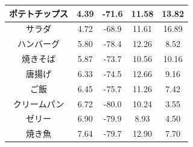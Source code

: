 \begin{table}[t]
{\begin{tabular}{c|c|c|c|c}
            ポテトチップス     & 4.39         & -71.6                                                                                              & 11.58                                                        & 13.82                                                        \\ \hline
            サラダ         & 4.72         & -68.9                                                                                              & 11.61                                                        & 16.89                                                        \\ \hline
            ハンバーグ       & 5.80         & -78.4                                                                                              & 12.26                                                        & 8.52                                                         \\ \hline
            焼きそば        & 5.87         & -73.7                                                                                              & 10.56                                                        & 10.16                                                        \\ \hline
            唐揚げ         & 6.33         & -74.5                                                                                              & 12.66                                                        & 9.16                                                         \\ \hline
            ご飯          & 6.45         & -75.7                                                                                              & 11.26                                                        & 7.42                                                         \\ \hline
            クリームパン      & 6.72         & -80.0                                                                                              & 10.24                                                        & 3.55                                                         \\ \hline
            ゼリー         & 6.90         & -79.9                                                                                              & 8.93                                                         & 4.50                                                         \\ \hline
            焼き魚         & 7.64         & -79.7                                                                                              & 12.90                                                        & 7.70                                                         \\ \hline
        \end{tabular}
    }
\end{table}

